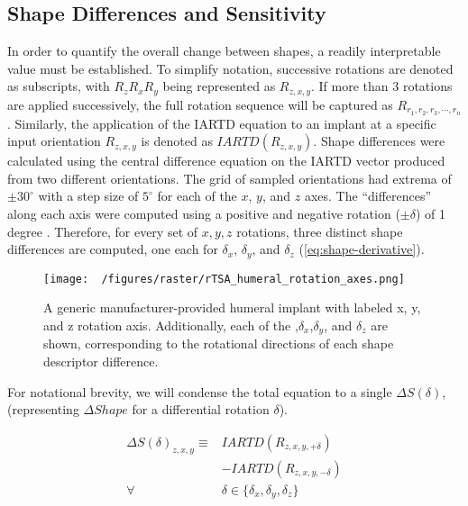 \subsection{Shape Differences and Sensitivity}
In order to quantify the overall change between shapes, a readily interpretable value must be established.
To simplify notation, successive rotations are denoted as subscripts, with $R_{z}R_{x}R_{y}$ being represented as $R_{z,x,y}$.
If more than 3 rotations are applied successively, the full rotation sequence will be captured as $R_{r_{1},r_{2},r_{3},\cdots,r_{n}}$.
Similarly, the application of the IARTD equation to an implant at a specific input orientation $R_{z,x,y}$ is denoted as $IARTD(R_{z,x,y})$.
Shape differences were calculated using the central difference equation on the IARTD vector produced from two different orientations.
The grid of sampled orientations had extrema of $\pm 30^{\circ}$ with a step size of $5^{\circ}$ for each of the $x$, $y$, and $z$ axes.
The ``differences'' along each axis were computed using a positive and negative rotation ($\pm \delta $) of 1 degree .
Therefore, for every set of $x,y,z$ rotations, three distinct shape differences are computed, one each for $\delta_{x}$, $\delta_{y}$, and $\delta_{z}$ (\cref{eq:shape-derivative}).

\begin{figure}[h!]
  \centering
  \texttt{[image: ~/figures/raster/rTSA\_humeral\_rotation\_axes.png]}
  \caption[A generic manufacturer-provided humeral implant with labeled x, y, and z rotation axis]{A generic manufacturer-provided humeral implant with labeled x, y, and z rotation axis. Additionally, each of the ,$\delta_x$,$\delta_y$, and $\delta_z$ are shown, corresponding to the rotational directions of each shape descriptor difference.}
  \label{fig:rot-axis}
\end{figure}

For notational brevity, we will condense the total equation to a single $\Delta S(\delta)$, (representing $\Delta Shape$ for a differential rotation $\delta$).

\begin{equation}
	\label{eq:shape-derivative}
	\begin{split}
		\Delta S(\delta)_{z,x,y}  \equiv & IARTD(R_{z,x,y,+\delta})                        \\
		                                 & - IARTD(R_{z,x,y,-\delta})                      \\
		\forall                          & \delta \in \{\delta_{x},\delta_{y},\delta_{z}\}
	\end{split}
\end{equation}

